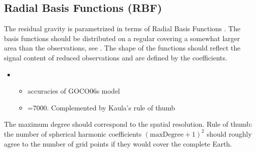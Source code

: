 \subsection{Radial Basis Functions (RBF)}
The residual gravity is parametrized in terms of Radial Basis Functions
.
The basis functions should be distributed on a regular  covering
a somewhat larger area than the observations, see .
The shape of the functions  should reflect
the signal content of reduced observations and are defined by the coefficients.
\begin{itemize}
  \item {}
  \begin{itemize}
    \item {} accuracies of GOCO06s model
    \item {}=7000. Complemented by Kaula's rule of thumb
  \end{itemize}
\end{itemize}
The maximum degree should correspond to the spatial resolution.
Rule of thumb: the number of spherical harmonic coefficients $(\text{maxDegree}+1)^2$ should roughly agree
to the number of grid points if they would cover the complete Earth.


